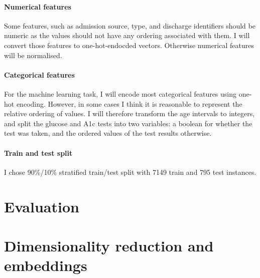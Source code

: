 \documentclass[10pt, twocolumn]{article}
\begin{document}
\paragraph{Numerical features} Some features, such as admission source, type, and discharge identifiers should be numeric as the values should not have any ordering associated with them. I will convert those features to one-hot-endocded vectors. Otherwise numerical features will be normalised.

\paragraph{Categorical features} For the machine learning task, I will encode most categorical features using one-hot encoding. However, in some cases I think it is reasonable to represent the relative ordering of values. I will therefore transform the age intervals to integers, and split the glucose and A1c tests into two variables: a boolean for whether the test was taken, and the ordered values of the test results otherwise.

\paragraph{Train and test split} I chose 90\%/10\% stratified train/test split with 7149 train and 795 test instances.

\section{Evaluation}

\section{Dimensionality reduction and embeddings}
\end{document}
